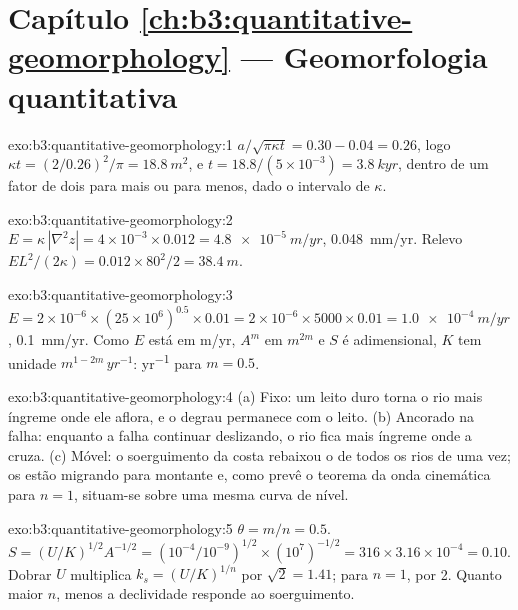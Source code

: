 \section*{Capítulo \ref{ch:b3:quantitative-geomorphology} --- Geomorfologia quantitativa}

\begin{solution}{exo:b3:quantitative-geomorphology:1}
$a/\sqrt{\pi\kappa t} = 0.30 - 0.04 = 0.26$, logo $\kappa t = (2/0.26)^2/\pi =
\qty{18.8}{m^2}$, e $t = 18.8/(5\times10^{-3}) = \qty{3.8}{kyr}$, dentro de um
fator de dois para mais ou para menos, dado o intervalo de $\kappa$.
\end{solution}

\begin{solution}{exo:b3:quantitative-geomorphology:2}
$E = \kappa\,|\nabla^2 z| = 4\times10^{-3}\times0.012 =
\qty{4.8e-5}{m/yr}$, \qty{0.048}{mm/yr}. Relevo $E L^2/(2\kappa) =
0.012\times80^2/2 = \qty{38.4}{m}$.
\end{solution}

\begin{solution}{exo:b3:quantitative-geomorphology:3}
$E = 2\times10^{-6}\times(25\times10^6)^{0.5}\times0.01 = 2\times10^{-6}
\times5000\times0.01 = \qty{1.0e-4}{m/yr}$, \qty{0.1}{mm/yr}. Como $E$ está
em \unit{m/yr}, $A^m$ em $\unit{m}^{2m}$ e $S$ é adimensional, $K$ tem
unidade $\unit{m}^{1-2m}\,\unit{yr^{-1}}$: \unit{yr^{-1}} para $m = 0.5$.
\end{solution}

\begin{solution}{exo:b3:quantitative-geomorphology:4}
(a) Fixo: um leito duro torna o rio mais íngreme onde ele aflora, e o degrau
permanece com o leito. (b) Ancorado na falha: enquanto a falha continuar deslizando,
o rio fica mais íngreme onde a cruza. (c) Móvel: o soerguimento da
costa rebaixou o  de todos os rios de uma vez; os 
estão migrando para montante e, como prevê o teorema da onda cinemática para $n
= 1$, situam-se sobre uma mesma curva de nível.
\end{solution}

\begin{solution}{exo:b3:quantitative-geomorphology:5}
$\theta = m/n = 0.5$. $S = (U/K)^{1/2}A^{-1/2} = (10^{-4}/10^{-9})^{1/2}
\times(10^7)^{-1/2} = 316\times3.16\times10^{-4} = 0.10$. Dobrar $U$
multiplica $k_s = (U/K)^{1/n}$ por $\sqrt2 = 1.41$; para $n = 1$, por 2. Quanto
maior $n$, menos a declividade responde ao soerguimento.
\end{solution}

